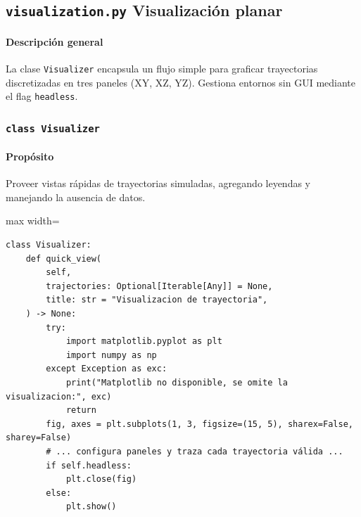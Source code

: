 
\subsection{\texttt{visualization.py} \- Visualización planar}
\paragraph{Descripción general}
La clase \texttt{Visualizer} encapsula un flujo simple para graficar trayectorias discretizadas en tres paneles (XY, XZ, YZ). Gestiona entornos sin GUI mediante el flag \texttt{headless}.

\subsubsection{\texttt{class Visualizer}}
\paragraph{Propósito} Proveer vistas rápidas de trayectorias simuladas, agregando leyendas y manejando la ausencia de datos.

\begin{listing}[H]
\caption{Método \texttt{quick\_view} con degradación a modo headless}
\begin{adjustbox}{max width=\textwidth}
\begin{minipage}{\textwidth}
\begin{verbatim}
class Visualizer:
    def quick_view(
        self,
        trajectories: Optional[Iterable[Any]] = None,
        title: str = "Visualizacion de trayectoria",
    ) -> None:
        try:
            import matplotlib.pyplot as plt
            import numpy as np
        except Exception as exc:
            print("Matplotlib no disponible, se omite la visualizacion:", exc)
            return
        fig, axes = plt.subplots(1, 3, figsize=(15, 5), sharex=False, sharey=False)
        # ... configura paneles y traza cada trayectoria válida ...
        if self.headless:
            plt.close(fig)
        else:
            plt.show()
\end{verbatim}
\end{minipage}
\end{adjustbox}
\end{listing}

